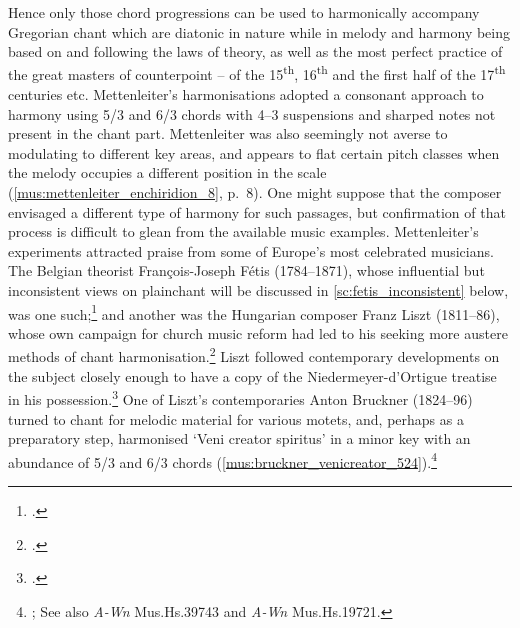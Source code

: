   {\cite[p.~xxxxvi {[\emph{sic}]}]{MettenleiterEnchiridionchoralesive1854}}
{Hence only those chord progressions can be used to harmonically accompany Gregorian chant which are diatonic in nature while in melody and harmony being based on and following the laws of theory, as well as the most perfect practice of the great masters of \linebreak{}counterpoint -- of the 15\textsuperscript{th}, 16\textsuperscript{th} and the first half of the 17\textsuperscript{th} centuries etc.}
\noindent
Mettenleiter's harmonisations adopted a consonant approach to harmony using 5/3 and 6/3 chords with 4--3 suspensions and sharped notes not present in the chant part.
Mettenleiter was also seemingly not averse to modulating to different key areas, and appears to flat certain pitch classes when the melody occupies a different position in the scale (\cref{mus:mettenleiter_enchiridion_8}, p.~8). One might suppose that the composer envisaged a different type of harmony for such passages, but confirmation of that process is difficult to glean from the available music examples.
Mettenleiter's experiments attracted praise from some of Europe's most celebrated musicians.
The Belgian theorist François-Joseph Fétis (1784--1871), whose influential but inconsistent views on plainchant will be discussed in \cref{sc:fetis_inconsistent} below, was one such;\footcite[89]{WagenerBegleitunggregorianischenChorals1964} and another was the Hungarian composer Franz Liszt (1811--86), whose own campaign for church music reform had led to his seeking more austere methods of chant harmonisation.\footcite[88--9]{MerrickRevolutionReligionMusic1987}
Liszt followed contemporary developments on the subject closely enough to have a copy of the Niedermeyer-d'Ortigue treatise in his possession.\footcite[13]{DufetelReligiousWorkshopGregorian2014}
One of Liszt's contemporaries Anton Bruckner (1824--96) turned to chant for melodic material for various motets, and, perhaps as a preparatory step, harmonised `Veni creator spiritus' in a minor key with an abundance of 5/3 and 6/3 chords (\cref{mus:bruckner_venicreator_524}).\footnote{\cite[524]{GoellerichAntonBrucknerLebens1936}; See also \emph{A-Wn} Mus.Hs.39743 and \emph{A-Wn} Mus.Hs.19721.}

